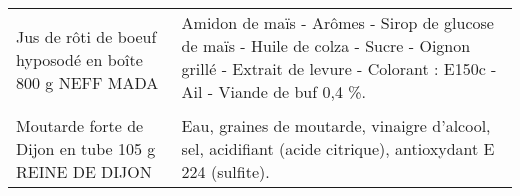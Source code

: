\begin{longtable}{p{5cm}p{10cm}}
                                                   Jus de rôti de boeuf hyposodé en boîte 800 g NEFF MADA &                                                                                                                                                                                                                                                                                                                                                                                                                                                                                                                                                                                                                                                                                                                                                                                                                                                                         Amidon de maïs - Arômes - Sirop de glucose de maïs - Huile de colza - Sucre - Oignon grillé - Extrait de levure - Colorant : E150c - Ail - Viande de buf 0,4 \%. \\
                                                     Moutarde forte de Dijon en tube 105 g REINE DE DIJON &                                                                                                                                                                                                                                                                                                                                                                                                                                                                                                                                                                                                                                                                                                                                                                                                                                                                                                                              Eau, graines de moutarde, vinaigre d'alcool, sel, acidifiant (acide citrique), antioxydant E 224 (sulfite). \\

\end{longtable}
